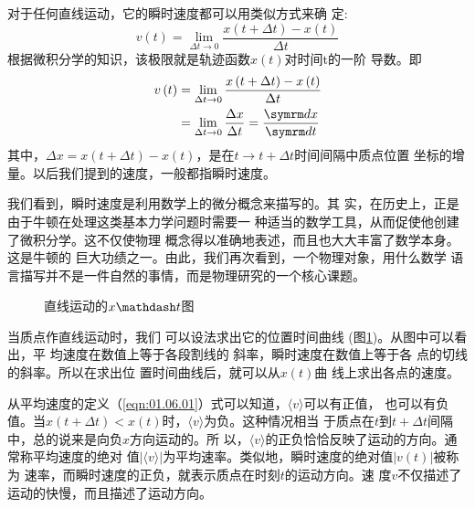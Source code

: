 对于任何直线运动，它的瞬时速度都可以用类似方式来确
定:
\begin{equation*}
        v\left(t\right)=\lim _{\Delta t \rightarrow 0} \frac{x\left(t+\Delta t\right)-x\left(t\right)}{\Delta t}
\end{equation*}
根据微积分学的知识，该极限就是轨迹函数$x\left(t\right)$对时间t的一阶
导数。即
\begin{equation}
    \begin{aligned}
        v\left(t\right) & =\lim _{\Delta t \rightarrow 0} \frac{x\left(t+\Delta t\right)-x\left(t\right)}{\Delta t}                            \\
             & =\lim _{\Delta t \rightarrow 0} \frac{\Delta x}{\Delta t}=\frac{\dif x}{\dif t} \label{eqn:01.06.03}
    \end{aligned}
\end{equation}
其中，$\Delta x=x\left(t+\Delta t\right)-x\left(t\right)$，是在$t\rightarrow t+\Delta t$时间间隔中质点位置
坐标的增量。以后我们提到的速度，一般都指瞬时速度。

我们看到，瞬时速度是利用数学上的微分概念来描写的。其
实，在历史上，正是由于牛顿在处理这类基本力学问题时需要一
种适当的数学工具，从而促使他创建了微积分学。这不仅使物理
概念得以准确地表述，而且也大大丰富了数学本身。这是牛顿的
巨大功绩之一。由此，我们再次看到，一个物理对象，用什么数学
语言描写并不是一件自然的事情，而是物理研究的一个核心课题。

\begin{wrapfigure}[10]{r}{13em}
    \small \vspace{-1.2em}
    \centering
    \caption{直线运动的$x \mathdash t$图}
    \label{fig:01.10}
\end{wrapfigure}
当质点作直线运动时，我们
可以设法求出它的位置时间曲线
(图\ref{fig:01.10})。从图中可以看出，平
均速度在数值上等于各段割线的
斜率，瞬时速度在数值上等于各
点的切线的斜率。所以在求出位
置时间曲线后，就可以从$x\left(t\right)$曲
线上求出各点的速度。

从平均速度的定义（\ref{eqn:01.06.01}）式可以知道，$\langle v\rangle$可以有正值，
也可以有负值。当$x\left(t+\Delta t\right)<x\left(t\right)$时，$\langle v\rangle$为负。这种情况相当
于质点在$t$到$t+\Delta t$间隔中，总的说来是向负$x$方向运动的。所
以，$\langle v\rangle$的正负恰恰反映了运动的方向。通常称平均速度的绝对
值$|\langle v\rangle|$为平均速率。类似地，瞬时速度的绝对值$|v\left(t\right)|$被称为
速率，而瞬时速度的正负，就表示质点在时刻$t$的运动方向。速
度$v$不仅描述了运动的快慢，而且描述了运动方向。